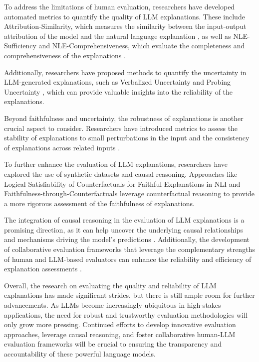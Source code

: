 \documentclass[11pt]{article}
\begin{document}
To address the limitations of human evaluation, researchers have developed automated metrics to quantify the quality of LLM explanations. These include Attribution-Similarity, which measures the similarity between the input-output attribution of the model and the natural language explanation \cite{ref272}, as well as NLE-Sufficiency and NLE-Comprehensiveness, which evaluate the completeness and comprehensiveness of the explanations \cite{ref272}.

Additionally, researchers have proposed methods to quantify the uncertainty in LLM-generated explanations, such as Verbalized Uncertainty \cite{ref273} and Probing Uncertainty \cite{ref273}, which can provide valuable insights into the reliability of the explanations.

Beyond faithfulness and uncertainty, the robustness of explanations is another crucial aspect to consider. Researchers have introduced metrics to assess the stability of explanations to small perturbations in the input \cite{ref274} and the consistency of explanations across related inputs \cite{ref275}.

To further enhance the evaluation of LLM explanations, researchers have explored the use of synthetic datasets and causal reasoning. Approaches like Logical Satisfiability of Counterfactuals for Faithful Explanations in NLI \cite{ref276} and Faithfulness-through-Counterfactuals \cite{ref276} leverage counterfactual reasoning to provide a more rigorous assessment of the faithfulness of explanations.

The integration of causal reasoning in the evaluation of LLM explanations is a promising direction, as it can help uncover the underlying causal relationships and mechanisms driving the model's predictions \cite{ref277}. Additionally, the development of collaborative evaluation frameworks that leverage the complementary strengths of human and LLM-based evaluators can enhance the reliability and efficiency of explanation assessments \cite{ref278}.

Overall, the research on evaluating the quality and reliability of LLM explanations has made significant strides, but there is still ample room for further advancements. As LLMs become increasingly ubiquitous in high-stakes applications, the need for robust and trustworthy evaluation methodologies will only grow more pressing. Continued efforts to develop innovative evaluation approaches, leverage causal reasoning, and foster collaborative human-LLM evaluation frameworks will be crucial to ensuring the transparency and accountability of these powerful language models.
\end{document}
